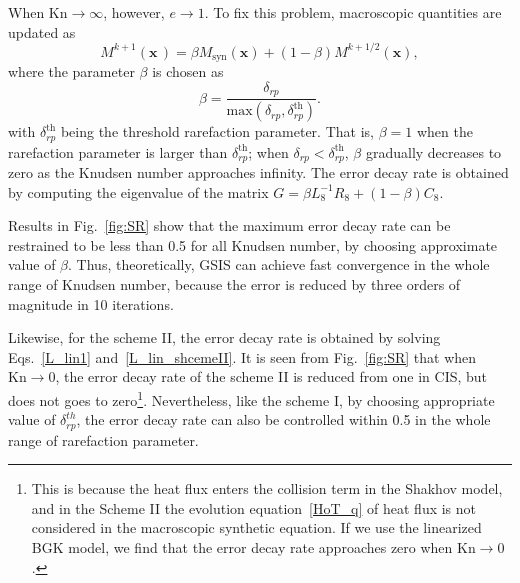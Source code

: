 When $\text{Kn}\rightarrow\infty$, however, $e\rightarrow1$. To fix this problem, macroscopic quantities are updated as
\begin{equation}\label{GSIS_K3}
M^{k+1}(\bm{x}\,)=\beta{}M_{\text{syn}}(\bm{x})+(1-\beta)M^{k+1/2}(\bm{x}),
\end{equation}
where the parameter $\beta$ is chosen as
\begin{equation}\label{relax_parameter}
\beta=\frac{\delta_{rp}}{\text{max}(\delta_{rp},\delta_{rp}^\text{th})}.
\end{equation}
with $\delta_{rp}^\text{th}$ being the threshold rarefaction parameter. That is, $\beta=1$ when the rarefaction parameter is larger than $\delta_{rp}^\text{th}$; when $\delta_{rp}<\delta_{rp}^\text{th}$, $\beta$ gradually decreases to zero as the Knudsen number approaches infinity. The error decay rate is obtained by computing the eigenvalue of the matrix
$G=\beta{L_8^{-1}R_8}+(1-\beta)C_8$.

Results in Fig.~\ref{fig:SR} show that the maximum error decay rate can be restrained to be less than 0.5 for all Knudsen number, by choosing approximate value of $\beta$.  Thus, theoretically, GSIS can achieve fast convergence in the whole range of Knudsen number, because  the error is reduced by three orders of magnitude in 10 iterations. 


Likewise, for the scheme II, the error decay rate is obtained by solving Eqs.~\eqref{L_lin1} and~\eqref{L_lin_shcemeII}.  It is seen from Fig.~\ref{fig:SR} that when $\text{Kn}\rightarrow0$, the error decay rate of the scheme II is reduced from one in CIS, but does not goes to zero\footnote{This is because the heat flux enters the collision term in the Shakhov model, and in the Scheme II the evolution equation~\eqref{HoT_q} of heat flux is not considered in the macroscopic synthetic equation. If we use the linearized BGK model, we find that the error decay rate approaches zero when $\text{Kn}\rightarrow0$.}. Nevertheless, like the scheme I, by choosing appropriate value of $\delta_{rp}^{th}$, the error decay rate can also be controlled within 0.5 in the whole range of rarefaction parameter.
	
	

	


